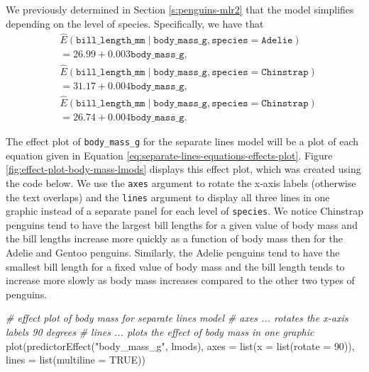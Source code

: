 \documentclass[
]{book}
\newenvironment{Shaded}{\begin{snugshade}}{\end{snugshade}}
\newcommand{\AttributeTok}[1]{\textcolor[rgb]{0.77,0.63,0.00}{#1}}
\newcommand{\CommentTok}[1]{\textcolor[rgb]{0.56,0.35,0.01}{\textit{#1}}}
\newcommand{\ConstantTok}[1]{\textcolor[rgb]{0.00,0.00,0.00}{#1}}
\newcommand{\DecValTok}[1]{\textcolor[rgb]{0.00,0.00,0.81}{#1}}
\newcommand{\FunctionTok}[1]{\textcolor[rgb]{0.00,0.00,0.00}{#1}}
\newcommand{\NormalTok}[1]{#1}
\newcommand{\StringTok}[1]{\textcolor[rgb]{0.31,0.60,0.02}{#1}}
\theoremstyle{definition}
\theoremstyle{definition}
\theoremstyle{definition}
\theoremstyle{definition}
\theoremstyle{remark}
\begin{document}
We previously determined in Section \ref{s:penguins-mlr2} that the
model simplifies depending on the level of species. Specifically, we
have that \[
\begin{aligned}
&\hat{E}(\mathtt{bill\_length\_mm} \mid \mathtt{body\_mass\_g}, \mathtt{species}=\mathtt{Adelie}) \\
&= 26.99 + 0.003 \mathtt{body\_mass\_g},\\
&\hat{E}(\mathtt{bill\_length\_mm} \mid \mathtt{body\_mass\_g}, \mathtt{species}=\mathtt{Chinstrap}) \\
&= 31.17 + 0.004 \mathtt{body\_mass\_g},\\
&\hat{E}(\mathtt{bill\_length\_mm} \mid \mathtt{body\_mass\_g}, \mathtt{species}=\mathtt{Chinstrap}) \\
&= 26.74 + 0.004 \mathtt{body\_mass\_g}.
\end{aligned}
\label{eq:separate-lines-equations-effects-plot}
\]

The effect plot of \texttt{body\_mass\_g} for the separate lines model will be a
plot of each equation given in Equation
\eqref{eq:separate-lines-equations-effects-plot}. Figure
\ref{fig:effect-plot-body-mass-lmods} displays this effect plot, which
was created using the code below. We use the \texttt{axes} argument to rotate
the x-axis labels (otherwise the text overlaps) and the \texttt{lines}
argument to display all three lines in one graphic instead of a
separate panel for each level of \texttt{species}. We notice Chinstrap penguins
tend to have the largest bill lengths for a given value of body mass and
the bill lengths increase more quickly as a function of body mass then
for the Adelie and Gentoo penguins. Similarly, the Adelie penguins tend
to have the smallest bill length for a fixed value of body mass and the
bill length tends to increase more slowly as body mass increases
compared to the other two types of penguins.

\begin{Shaded}
\begin{Highlighting}[]
\CommentTok{\# effect plot of body mass for separate lines model}
\CommentTok{\# axes ... rotates the x{-}axis labels 90 degrees}
\CommentTok{\# lines ... plots the effect of body mass in one graphic}
\FunctionTok{plot}\NormalTok{(}\FunctionTok{predictorEffect}\NormalTok{(}\StringTok{"body\_mass\_g"}\NormalTok{, lmods),}
     \AttributeTok{axes =} \FunctionTok{list}\NormalTok{(}\AttributeTok{x =} \FunctionTok{list}\NormalTok{(}\AttributeTok{rotate =} \DecValTok{90}\NormalTok{)),}
     \AttributeTok{lines =} \FunctionTok{list}\NormalTok{(}\AttributeTok{multiline =} \ConstantTok{TRUE}\NormalTok{))}
\end{Highlighting}
\end{Shaded}
\end{document}
